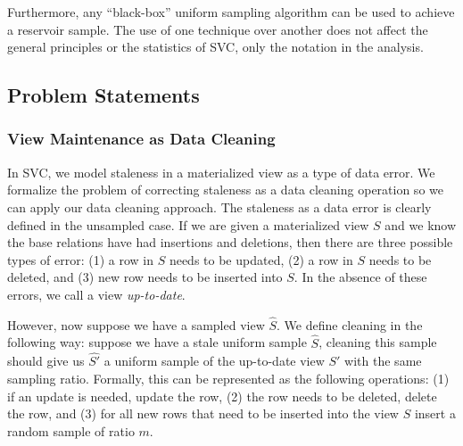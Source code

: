 Furthermore, any ``black-box'' uniform sampling algorithm can be used to achieve a reservoir sample.
The use of one technique over another does not affect the general principles or the statistics of SVC, only the 
notation in the analysis.
\fi

\subsection{Problem Statements}
\subsubsection{View Maintenance as Data Cleaning}\label{cleaning}
In SVC, we model staleness in a materialized view as a type of data error.
We formalize the problem of correcting staleness as a data cleaning operation so we can apply our data cleaning approach.
The staleness as a data error is clearly defined in the unsampled case.
If we are given a materialized view $S$ and we know the base relations have had insertions and deletions, then there are three possible types of error:
(1) a row in $S$ needs to be updated, (2) a row in $S$ needs to be deleted, and (3) new row needs to be inserted into $S$.
In the absence of these errors, we call a view \emph{up-to-date}.

However, now suppose we have a sampled view $\hat{S}$.
We define cleaning in the following way: suppose we have a stale uniform sample $\hat{S}$, cleaning this sample
should give us $\hat{S'}$ a uniform sample of the up-to-date view $S'$ with the same sampling ratio.
Formally, this can be represented as the following operations: (1) if an update is needed, update the row, (2) the row needs to be deleted, delete the row, and (3) for all new rows that need to be inserted into the view $S$ insert a random sample of ratio $m$.

